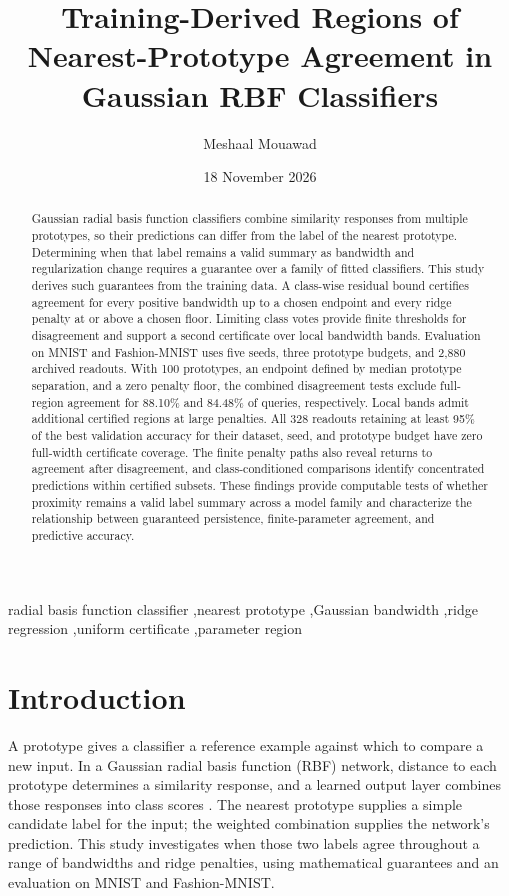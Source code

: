 \documentclass[preprint,12pt,authoryear]{elsarticle}
\date{18 November 2026}
\begin{document}
\begin{frontmatter}
\title{Training-Derived Regions of Nearest-Prototype Agreement in Gaussian RBF Classifiers}
\author[msu]{Meshaal Mouawad}
\begin{abstract}
Gaussian radial basis function classifiers combine similarity responses from multiple prototypes, so their predictions can differ from the label of the nearest prototype. Determining when that label remains a valid summary as bandwidth and regularization change requires a guarantee over a family of fitted classifiers. This study derives such guarantees from the training data. A class-wise residual bound certifies agreement for every positive bandwidth up to a chosen endpoint and every ridge penalty at or above a chosen floor. Limiting class votes provide finite thresholds for disagreement and support a second certificate over local bandwidth bands. Evaluation on MNIST and Fashion-MNIST uses five seeds, three prototype budgets, and 2,880 archived readouts. With 100 prototypes, an endpoint defined by median prototype separation, and a zero penalty floor, the combined disagreement tests exclude full-region agreement for 88.10\% and 84.48\% of queries, respectively. Local bands admit additional certified regions at large penalties. All 328 readouts retaining at least 95\% of the best validation accuracy for their dataset, seed, and prototype budget have zero full-width certificate coverage. The finite penalty paths also reveal returns to agreement after disagreement, and class-conditioned comparisons identify concentrated predictions within certified subsets. These findings provide computable tests of whether proximity remains a valid label summary across a model family and characterize the relationship between guaranteed persistence, finite-parameter agreement, and predictive accuracy.
\end{abstract}
\begin{keyword}
radial basis function classifier \sep nearest prototype \sep Gaussian bandwidth \sep ridge regression \sep uniform certificate \sep parameter region
\end{keyword}
\end{frontmatter}
\section{Introduction}
A prototype gives a classifier a reference example against which to compare a new input. In a Gaussian radial basis function (RBF) network, distance to each prototype determines a similarity response, and a learned output layer combines those responses into class scores \citep{broomhead1988}. The nearest prototype supplies a simple candidate label for the input; the weighted combination supplies the network's prediction. This study investigates when those two labels agree throughout a range of bandwidths and ridge penalties, using mathematical guarantees and an evaluation on MNIST and Fashion-MNIST.
\end{document}
